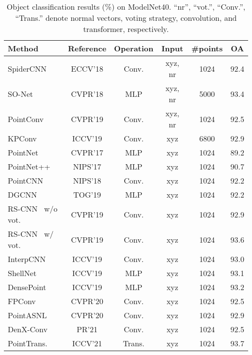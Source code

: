 \documentclass[preprint,12pt]{elsarticle}
\begin{document}
\begin{table*}[t]
	\begin{center}
		\footnotesize
		\caption{Object classification results (\%) on ModelNet40. ``nr'', ``vot.'', ``Conv.'', ``Trans.'' denote normal vectors, voting strategy, convolution, and transformer, respectively.}
\vspace{0cm}
		\begin{tabular}{l|cccc|c}
			\toprule
			Method & Reference & Operation & Input & \#points & OA  \\
			\midrule
			\midrule
			SpiderCNN \citep{xu2018spidercnn} & ECCV'18  & Conv.  &  xyz, nr & 1024   & 92.4  \\
			SO-Net \citep{li2018so}  & CVPR'18 & MLP   &  xyz, nr & 5000     & 93.4 \\
			PointConv~\citep{wu2019pointconv} & CVPR'19 & Conv.    &  xyz, nr & 1024    & 92.5  \\
KPConv \citep{thomas2019kpconv}& ICCV'19 & Conv.  &  xyz & 6800   & 92.9 \\
			\midrule
			PointNet \citep{qi2017pointnet} & CVPR'17 & MLP   &  xyz & 1024  & 89.2 \\
			PointNet++ \citep{qi2017pointnet++}  & NIPS'17 & MLP  &  xyz & 1024 & 90.7 \\
			PointCNN \citep{li2018pointcnn} & NIPS'18 & Conv.   &  xyz & 1024 & 92.2   \\
			DGCNN~\citep{wang2019dynamic}  & TOG'19 & MLP  &  xyz & 1024  & 92.2\\
			RS-CNN~\citep{liu2019relation} w/o vot.& CVPR'19 & Conv. &  xyz &1024  & 92.9  \\
			RS-CNN~\citep{liu2019relation} w/ vot. & CVPR'19 & Conv. &  xyz &1024  & 93.6 \\
			InterpCNN~\citep{mao2019interpolated}  & ICCV'19 & Conv.  &  xyz& 1024   & 93.0 \\
			ShellNet~\cite{zhang2019shellnet} & ICCV'19 & MLP  &  xyz & 1024  & 93.1  \\
			DensePoint~\citep{liu2019densepoint} & ICCV'19 & MLP  &  xyz & 1024  & 93.2  \\
FPConv~\citep{lin2020fpconv}  & CVPR'20  & Conv.  &  xyz& 1024     & 92.5 \\
			PointASNL~\citep{yan2020pointasnl}& CVPR'20 & Conv. &  xyz& 1024     & 92.9  \\
			DenX-Conv~\cite{lee2021connectivity} & PR'21 & Conv.   &  xyz & 1024 & 92.5   \\
			PointTrans.~\cite{zhao2021point} & ICCV'21 & Trans. &  xyz&1024  & 93.7 \\

\end{tabular}
\end{center}
\end{table*}
\end{document}
